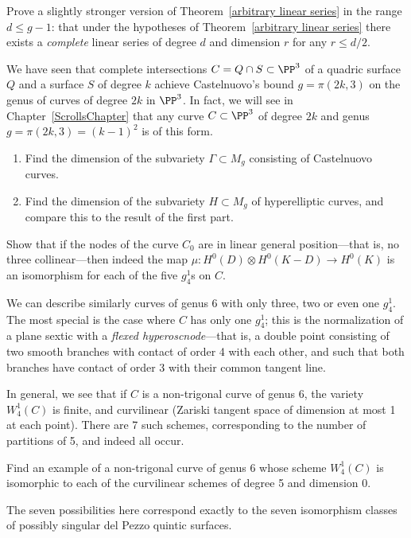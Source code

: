 \begin{exercise}
Prove a slightly stronger version of Theorem~\ref{arbitrary linear series} in the range $d \leq g-1$: that under the hypotheses of Theorem~\ref{arbitrary linear series} there exists a \emph{complete} linear series of degree $d$ and dimension $r$ for any $r \leq d/2$.
\end{exercise}

\begin{exercise}\label{rarity of Castelnuovo}
We have seen that complete intersections $C = Q \cap S \subset \PP^3$ of a quadric surface $Q$ and a surface $S$ of degree $k$ achieve Castelnuovo's bound $g = \pi(2k, 3)$ on the genus of curves of degree $2k$ in $\PP^3$. In fact, we will see in Chapter~\ref{ScrollsChapter} that any curve $C \subset \PP^3$ of degree $2k$ and genus $g = \pi(2k, 3) = (k-1)^2$ is of this form.
\begin{enumerate}
\item Find the dimension of the subvariety $\Gamma \subset M_g$ consisting of Castelnuovo curves.
\item Find the dimension of the subvariety $H \subset M_g$ of hyperelliptic curves, and compare this to the result of the first part.
\end{enumerate}
\end{exercise}


\begin{exercise}\label{nonreduced Wrd}
Show that if the nodes of the curve $C_0$ are in linear general position---that is, no three collinear---then indeed the map $\mu : H^0(D) \otimes H^0(K-D) \to H^0(K)$ is an isomorphism for each of the five $g^1_4$s on $C$.
\end{exercise}

We can describe similarly curves of genus 6 with only three, two or even one $g^1_4$. The most special is the case where $C$ has only one $g^1_4$; this is the normalization of a plane sextic with a \emph{flexed hyperoscnode}---that is, a double point consisting of two smooth branches with contact of order 4 with each other, and such that both branches have contact of order 3 with their common tangent line.

In general, we see that if $C$ is a non-trigonal curve of genus 6, the variety $W^1_4(C)$ is finite, and curvilinear (Zariski tangent space of dimension at most 1 at each point). There are 7 such schemes, corresponding to the number of partitions of 5, and indeed all occur.

\begin{exercise}
Find an example of a non-trigonal curve of genus 6 whose scheme $W^1_4(C)$ is isomorphic to each of the curvilinear schemes of degree 5 and dimension 0.
\end{exercise}

\begin{fact}
The seven possibilities here correspond exactly to the seven isomorphism classes of possibly singular del Pezzo quintic surfaces.
\end{fact}




